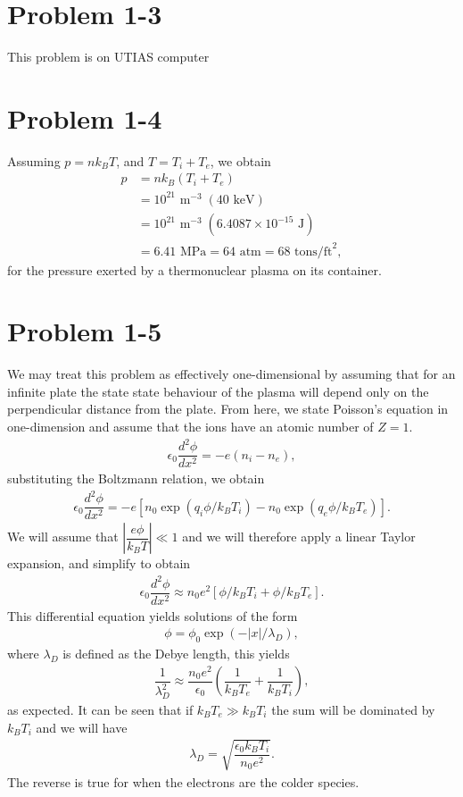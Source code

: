 \section*{Problem 1-3}
\label{sec:1-3}
This problem is on UTIAS computer

\section*{Problem 1-4}
\label{sec:1-4}
Assuming \(p = nk_BT\), and \(T = T_i + T_e\), we obtain
\begin{align}
	p &= nk_B(T_i + T_e) \\
	&= 10^{21}\text{ m}^{-3} \;(40\text{ keV}) \\
	&= 10^{21}\text{ m}^{-3} \;(6.4087\times10^{-15}\text{ J}) \\
	&= 6.41 \text{ MPa} = 64 \text{ atm} = 68 \text{ tons/ft}^2,
\end{align}
for the pressure exerted by a thermonuclear plasma on its container.

\section*{Problem 1-5}
\label{sec:1-5}
We may treat this problem as effectively one-dimensional by assuming that for an infinite plate the state state behaviour of the plasma will depend only on the perpendicular distance from the plate. From here, we state Poisson's equation in one-dimension and assume that the ions have an atomic number of \(Z = 1\).
\begin{align}
	\epsilon_0 \dfrac{d^2 \phi}{dx^2} = -e\left(n_i - n_e \right),
\end{align}
substituting the Boltzmann relation, we obtain
\begin{align}
	\epsilon_0 \dfrac{d^2 \phi}{dx^2} = -e\left[n_0\exp{(q_i\phi/k_BT_i)} - n_0\exp{(q_e\phi/k_BT_e)} \right].
\end{align}
We will assume that \(|\dfrac{e\phi}{k_BT}| \ll 1 \) and we will therefore apply a linear Taylor expansion, and simplify to obtain
\begin{align}
	\epsilon_0 \dfrac{d^2 \phi}{dx^2} \approx n_0e^2\left[\phi/k_BT_i + \phi/k_BT_e \right].
\end{align}
This differential equation yields solutions of the form
\begin{align}
	\phi = \phi_0 \exp{(-|x|/\lambda_D)},
\end{align}
where \(\lambda_D \) is defined as the Debye length, this yields
\begin{align}
	\dfrac{1}{\lambda_D^2} \approx \dfrac{n_0e^2}{\epsilon_0}\left(\dfrac{1}{k_BT_e} + \dfrac{1}{k_BT_i}  \right),
\end{align}
as expected. It can be seen that if \(k_BT_e \gg k_BT_i \) the sum will be dominated by \(k_BT_i \) and we will have
\begin{align}
	\lambda_D = \sqrt{\dfrac{\epsilon_0 k_BT_i}{n_0e^2}}.
\end{align}
The reverse is true for when the electrons are the colder species.

